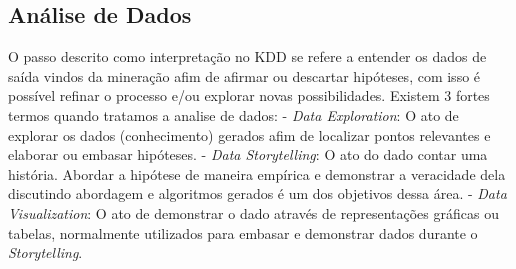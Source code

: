 \subsection{Análise de Dados}
O passo descrito como interpretação no KDD se refere a entender os dados de saída vindos da mineração afim de afirmar ou descartar hipóteses, com isso é possível refinar o processo e/ou explorar novas possibilidades. Existem 3 fortes termos quando tratamos a analise de dados:
- \textit{Data Exploration}: O ato de explorar os dados (conhecimento) gerados afim de localizar pontos relevantes e elaborar ou embasar hipóteses.
- \textit{Data Storytelling}: O ato do dado contar uma história. Abordar a hipótese de maneira empírica e demonstrar a veracidade dela discutindo abordagem e algoritmos gerados é um dos objetivos dessa área.
- \textit{Data Visualization}: O ato de demonstrar o dado através de representações gráficas ou tabelas, normalmente utilizados para embasar e demonstrar dados durante o \textit{Storytelling}.


